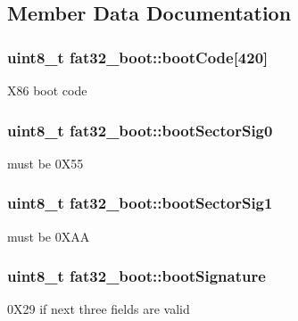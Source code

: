 \subsection{Member Data Documentation}
\subsubsection[{\texorpdfstring{boot\+Code}{bootCode}}]{\setlength{\rightskip}{0pt plus 5cm}uint8\+\_\+t fat32\+\_\+boot\+::boot\+Code\mbox{[}420\mbox{]}}\hypertarget{structfat32__boot_a7a74880066860140386edf3d9278b9f7}{}\label{structfat32__boot_a7a74880066860140386edf3d9278b9f7}
X86 boot code 
\subsubsection[{\texorpdfstring{boot\+Sector\+Sig0}{bootSectorSig0}}]{\setlength{\rightskip}{0pt plus 5cm}uint8\+\_\+t fat32\+\_\+boot\+::boot\+Sector\+Sig0}\hypertarget{structfat32__boot_a1cb46a5427b641a6017a082bc56df1be}{}\label{structfat32__boot_a1cb46a5427b641a6017a082bc56df1be}
must be 0\+X55 
\subsubsection[{\texorpdfstring{boot\+Sector\+Sig1}{bootSectorSig1}}]{\setlength{\rightskip}{0pt plus 5cm}uint8\+\_\+t fat32\+\_\+boot\+::boot\+Sector\+Sig1}\hypertarget{structfat32__boot_a53bc302a398f02a86d3b28f25a5ec8e2}{}\label{structfat32__boot_a53bc302a398f02a86d3b28f25a5ec8e2}
must be 0\+X\+AA 
\subsubsection[{\texorpdfstring{boot\+Signature}{bootSignature}}]{\setlength{\rightskip}{0pt plus 5cm}uint8\+\_\+t fat32\+\_\+boot\+::boot\+Signature}\hypertarget{structfat32__boot_ab79a1205277ecab05526fb0bac6e42f6}{}\label{structfat32__boot_ab79a1205277ecab05526fb0bac6e42f6}
0\+X29 if next three fields are valid 
